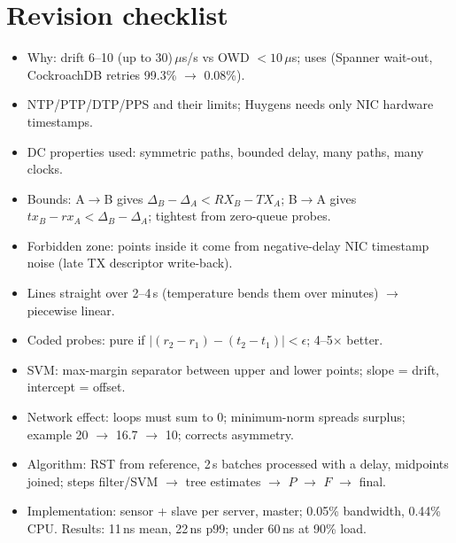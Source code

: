 \section{Revision checklist}
\begin{itemize}
  \item Why: drift 6--10 (up to 30)\,$\mu$s/s vs OWD $<10\,\mu$s; uses (Spanner wait-out, CockroachDB retries 99.3\% $\to$ 0.08\%).
  \item NTP/PTP/DTP/PPS and their limits; Huygens needs only NIC hardware timestamps.
  \item DC properties used: symmetric paths, bounded delay, many paths, many clocks.
  \item Bounds: A$\to$B gives $\Delta_B - \Delta_A < RX_B - TX_A$; B$\to$A gives $tx_B - rx_A < \Delta_B - \Delta_A$; tightest from zero-queue probes.
  \item Forbidden zone: points inside it come from negative-delay NIC timestamp noise (late TX descriptor write-back).
  \item Lines straight over 2--4\,s (temperature bends them over minutes) $\to$ piecewise linear.
  \item Coded probes: pure if $|(r_2 - r_1) - (t_2 - t_1)| < \epsilon$; 4--5$\times$ better.
  \item SVM: max-margin separator between upper and lower points; slope = drift, intercept = offset.
  \item Network effect: loops must sum to 0; minimum-norm spreads surplus; example 20 $\to$ 16.7 $\to$ 10; corrects asymmetry.
  \item Algorithm: RST from reference, 2\,s batches processed with a delay, midpoints joined; steps filter/SVM $\to$ tree estimates $\to$ $P$ $\to$ $F$ $\to$ final.
  \item Implementation: sensor + slave per server, master; 0.05\% bandwidth, 0.44\% CPU. Results: 11\,ns mean, 22\,ns p99; under 60\,ns at 90\% load.
\end{itemize}
